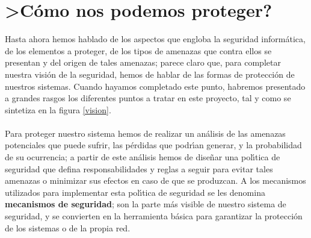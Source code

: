 \section{>C\'omo nos podemos proteger?}
Hasta ahora hemos hablado de los aspectos que engloba la seguridad 
inform\'atica, de los elementos a proteger, de los tipos de amenazas que contra 
ellos se presentan y del origen de tales amenazas; parece claro que, para 
completar nuestra visi\'on de la seguridad, hemos de hablar de las formas de 
protecci\'on de nuestros sistemas. Cuando hayamos completado este punto, 
habremos presentado a grandes rasgos los diferentes puntos a tratar en este 
proyecto, tal y como se sintetiza en la figura \ref{vision}.\\
\\Para proteger nuestro sistema hemos de realizar un an\'alisis de las amenazas
potenciales que puede sufrir, las p\'erdidas que podr\'{\i}an generar, y la
probabilidad de su ocurrencia; a partir de este an\'alisis hemos de dise\~nar 
una pol\'{\i}tica de seguridad que defina responsabilidades y reglas a seguir
para evitar tales amenazas o minimizar sus efectos en caso de que se produzcan.
A los mecanismos utilizados para implementar esta pol\'{\i}tica de seguridad
se les denomina {\bf mecanismos de seguridad}; son la parte m\'as visible
de nuestro sistema de seguridad, y se convierten en la herramienta b\'asica para
garantizar la protecci\'on de los sistemas o de la propia red.\\
